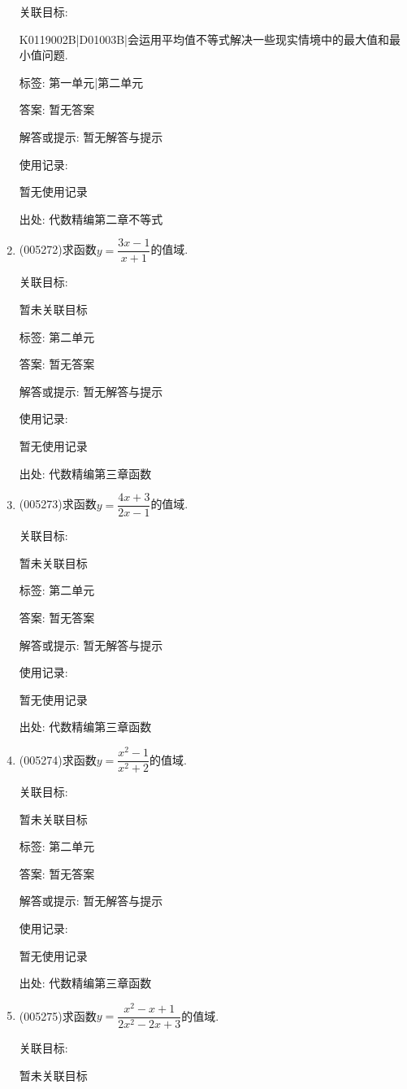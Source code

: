 \documentclass[10pt,a4paper]{article}
\begin{document}
\begin{enumerate}[1.]
关联目标:

K0119002B|D01003B|会运用平均值不等式解决一些现实情境中的最大值和最小值问题.



标签: 第一单元|第二单元

答案: 暂无答案

解答或提示: 暂无解答与提示

使用记录:

暂无使用记录


出处: 代数精编第二章不等式
\item { (005272)}求函数$y=\dfrac{3x-1}{x+1}$的值域.


关联目标:

暂未关联目标



标签: 第二单元

答案: 暂无答案

解答或提示: 暂无解答与提示

使用记录:

暂无使用记录


出处: 代数精编第三章函数
\item { (005273)}求函数$y=\dfrac{4x+3}{2x-1}$的值域.


关联目标:

暂未关联目标



标签: 第二单元

答案: 暂无答案

解答或提示: 暂无解答与提示

使用记录:

暂无使用记录


出处: 代数精编第三章函数
\item { (005274)}求函数$y=\dfrac{x^2-1}{x^2+2}$的值域.


关联目标:

暂未关联目标



标签: 第二单元

答案: 暂无答案

解答或提示: 暂无解答与提示

使用记录:

暂无使用记录


出处: 代数精编第三章函数
\item { (005275)}求函数$y=\dfrac{x^2-x+1}{2x^2-2x+3}$的值域.


关联目标:

暂未关联目标




\end{enumerate}
\end{document}
